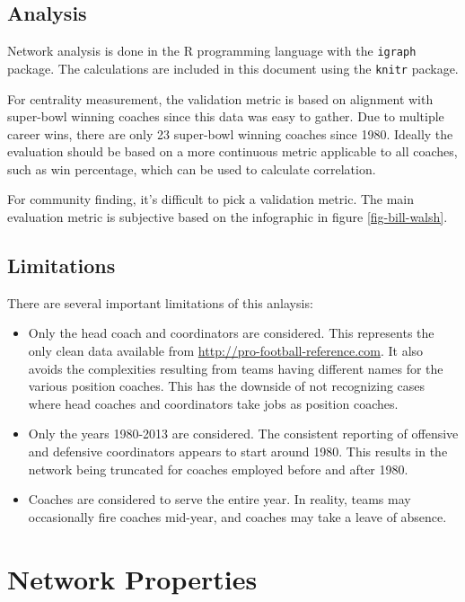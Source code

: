 \documentclass[11pt]{article}\usepackage[]{graphicx}\usepackage[]{color}
\begin{document}
\subsection{Analysis}

Network analysis is done in the R programming language with the {\tt igraph}
package.  The calculations are included in this document using the {\tt knitr}
package.

For centrality measurement, the validation metric is based on alignment with
super-bowl winning coaches since this data was easy to gather.  Due to multiple
career wins, there are only 23 super-bowl winning coaches since 1980.  Ideally
the evaluation should be based on a more continuous metric applicable to all
coaches, such as win percentage, which can be used to calculate correlation.

For community finding, it's difficult to pick a validation metric.  The main
evaluation metric is subjective based on the infographic in figure
\ref{fig-bill-walsh}.

\subsection{Limitations}

There are several important limitations of this anlaysis:

\begin{itemize}

\item Only the head coach and coordinators are considered.  This represents the
only clean data available from \url{http://pro-football-reference.com}.  It
also avoids the complexities resulting from teams having different names for
the various position coaches.  This has the downside of not recognizing cases
where head coaches and coordinators take jobs as position coaches.

\item Only the years 1980-2013 are considered.  The consistent reporting of
offensive and defensive coordinators appears to start around 1980.  This
results in the network being truncated for coaches employed before and after
1980.

\item Coaches are considered to serve the entire year.  In reality, teams may
occasionally fire coaches mid-year, and coaches may take a leave of absence.


\end{itemize}

\section{Network Properties}
\end{document}
